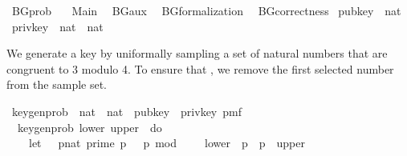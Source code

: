 %
\begin{isabellebody}%
%
%
\isadelimtheory
%
\endisadelimtheory
%
\isatagtheory
{}\isamarkupfalse%
\ BG{\isacharunderscore}{\kern0pt}prob\ \isanewline
\ \ Main\isanewline
\ \ BG{\isacharunderscore}{\kern0pt}aux\isanewline
\ \ BG{\isacharunderscore}{\kern0pt}formalization\isanewline
\ \ BG{\isacharunderscore}{\kern0pt}correctness\isanewline
{}%
\endisatagtheory
{\isafoldtheory}%
%
\isadelimtheory
%
\endisadelimtheory
%
\isadelimdocument
%
\endisadelimdocument
%
\isatagdocument
%
\isamarkuptrue%
%
\endisatagdocument
{\isafolddocument}%
%
\isadelimdocument
%
\endisadelimdocument
{}\isamarkupfalse%
\ pub{\isacharunderscore}{\kern0pt}key\ {\isacharequal}{\kern0pt}\ nat\isanewline
{}\isamarkupfalse%
\ priv{\isacharunderscore}{\kern0pt}key\ {\isacharequal}{\kern0pt}\ {\isachardoublequoteopen}nat\ {\isasymtimes}\ nat{\isachardoublequoteclose}%
\isadelimdocument
%
\endisadelimdocument
%
\isatagdocument
%
\isamarkuptrue%
%
\endisatagdocument
{\isafolddocument}%
%
\isadelimdocument
%
\endisadelimdocument
%
\begin{isamarkuptext}%
We generate a key by uniformally sampling a set of natural numbers that are congruent to 3 
modulo 4. To ensure that , we remove the first selected number from the sample set.%
\end{isamarkuptext}\isamarkuptrue%
\isamarkupfalse%
\ key{\isacharunderscore}{\kern0pt}gen{\isacharunderscore}{\kern0pt}prob\ {\isacharcolon}{\kern0pt}{\isacharcolon}{\kern0pt}\ {\isachardoublequoteopen}nat\ {\isasymRightarrow}\ nat\ {\isasymRightarrow}\ {\isacharparenleft}{\kern0pt}pub{\isacharunderscore}{\kern0pt}key\ {\isasymtimes}\ priv{\isacharunderscore}{\kern0pt}key{\isacharparenright}{\kern0pt}\ pmf{\isachardoublequoteclose}\isanewline
{}\ \isanewline
\ \ {\isachardoublequoteopen}key{\isacharunderscore}{\kern0pt}gen{\isacharunderscore}{\kern0pt}prob\ lower\ upper\ {\isacharequal}{\kern0pt}\ do\ {\isacharbraceleft}{\kern0pt}\isanewline
\ \ \ \ let\ {\isasymK}\ {\isacharequal}{\kern0pt}\ {\isacharbraceleft}{\kern0pt}{\isacharparenleft}{\kern0pt}p{\isacharcolon}{\kern0pt}{\isacharcolon}{\kern0pt}nat{\isacharparenright}{\kern0pt}{\isachardot}{\kern0pt}\ prime\ p\ {\isasymand}\ \ p\ mod\ {}\ {\isacharequal}{\kern0pt}\ {}\ {\isasymand}\ lower\ {\isasymle}\ p\ {\isasymand}\ p\ {\isasymle}\ upper{\isacharbraceright}{\kern0pt}{\isacharsemicolon}{\kern0pt}\isanewline

\end{isabellebody}
